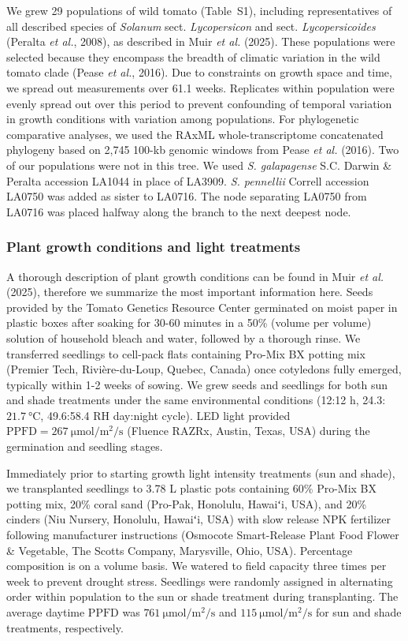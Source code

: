 \documentclass[
  letterpaper,
  DIV=11,
  numbers=noendperiod]{scrartcl}
\newcommand{\ppfd}{$\mathrm{PPFD}$}
\newcommand{\ppfdqty}[1]{$\SI{#1}{\micro\mole\per\meter\squared\per\second}$}
\begin{document}
We grew 29 populations of wild tomato (Table~S1),
including representatives of all described species of \emph{Solanum}
sect. \emph{Lycopersicon} and sect. \emph{Lycopersicoides} (Peralta
\emph{et al.}, 2008), as described in Muir \emph{et al.} (2025). These
populations were selected because they encompass the breadth of climatic
variation in the wild tomato clade (Pease \emph{et al.}, 2016). Due to
constraints on growth space and time, we spread out measurements over
61.1 weeks. Replicates within population were evenly spread out over
this period to prevent confounding of temporal variation in growth
conditions with variation among populations. For phylogenetic
comparative analyses, we used the RAxML whole-transcriptome concatenated
phylogeny based on 2,745 100-kb genomic windows from Pease \emph{et al.}
(2016). Two of our populations were not in this tree. We used \emph{S.
galapagense} S.C. Darwin \& Peralta accession LA1044 in place of LA3909.
\emph{S. pennellii} Correll accession LA0750 was added as sister to
LA0716. The node separating LA0750 from LA0716 was placed halfway along
the branch to the next deepest node.

\subsubsection{Plant growth conditions and light
treatments}\label{plant-growth-conditions-and-light-treatments}

A thorough description of plant growth conditions can be found in Muir
\emph{et al.} (2025), therefore we summarize the most important
information here. Seeds provided by the Tomato Genetics Resource Center
germinated on moist paper in plastic boxes after soaking for 30-60
minutes in a 50\% (volume per volume) solution of household bleach and
water, followed by a thorough rinse. We transferred seedlings to
cell-pack flats containing Pro-Mix BX potting mix (Premier Tech,
Rivière-du-Loup, Quebec, Canada) once cotyledons fully emerged,
typically within 1-2 weeks of sowing. We grew seeds and seedlings for
both sun and shade treatments under the same environmental conditions
(12:12 h, 24.3:\(\SI{21.7}{\degreeCelsius}\), 49.6:58.4 RH day:night
cycle). LED light provided
\(\mathrm{PPFD} = \SI{267}{\micro\mole\per\meter\squared\per\second}\)
(Fluence RAZRx, Austin, Texas, USA) during the germination and seedling
stages.

Immediately prior to starting growth light intensity treatments (sun and
shade), we transplanted seedlings to 3.78 L plastic pots containing 60\%
Pro-Mix BX potting mix, 20\% coral sand (Pro-Pak, Honolulu, Hawaiʻi,
USA), and 20\% cinders (Niu Nursery, Honolulu, Hawaiʻi, USA) with slow
release NPK fertilizer following manufacturer instructions (Osmocote
Smart-Release Plant Food Flower \& Vegetable, The Scotts Company,
Marysville, Ohio, USA). Percentage composition is on a volume basis. We
watered to field capacity three times per week to prevent drought
stress. Seedlings were randomly assigned in alternating order within
population to the sun or shade treatment during transplanting. The
average daytime \ppfd{} was \ppfdqty{761} and \ppfdqty{115} for sun and
shade treatments, respectively.
\end{document}

